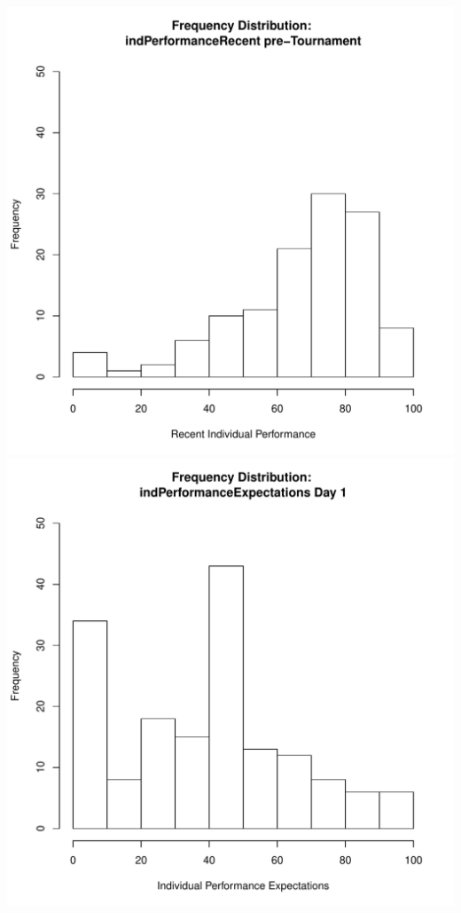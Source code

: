 \documentclass[12pt]{report}
\begin{document}
\includegraphics[scale =.4]{../images/distIndPerformancePre.pdf}
\includegraphics[scale =.4]{../images/distIndPerfExpDay1.pdf}
\end{document}
